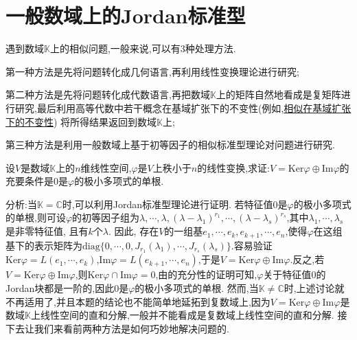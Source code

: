 \documentclass[../../main.tex]{subfiles}
\begin{document}
\section{一般数域上的Jordan标准型}

遇到数域$\mathbb{K}$上的相似问题,一般来说,可以有3种处理方法. 

第一种方法是先将问题转化成几何语言,再利用线性变换理论进行研究;

第二种方法是先将问题转化成代数语言,再把数域$\mathbb{K}$上的矩阵自然地看成是复矩阵进行研究,最后利用高等代数中若干概念在基域扩张下的不变性(例如,\hyperref[corollary:矩阵的相似关系在基域扩张下不变]{相似在基域扩张下的不变性}) 将所得结果返回到数域$\mathbb{K}$上;

第三种方法是利用一般数域上基于初等因子的相似标准型理论对问题进行研究. 

\begin{proposition}\label{proposition:数域K上关于核与值域的直和分解的充要条件}
设$V$是数域$\mathbb{K}$上的$n$维线性空间,$\varphi$是$V$上秩小于$n$的线性变换,求证:$V=\mathrm{Ker}\varphi\oplus\mathrm{Im}\varphi$的充要条件是$0$是$\varphi$的极小多项式的单根.
\end{proposition}
\begin{note}
分析:当$\mathbb{K}=\mathbb{C}$时,可以利用Jordan标准型理论进行证明. 若特征值$0$是$\varphi$的极小多项式的单根,则可设$\varphi$的初等因子组为$\lambda,\cdots,\lambda,(\lambda - \lambda_1)^{r_1},\cdots,(\lambda - \lambda_s)^{r_s}$,其中$\lambda_1,\cdots,\lambda_s$是非零特征值, 且有$k$个$\lambda$. 因此, 存在$V$的一组基$e_1,\cdots,e_k,e_{k + 1},\cdots,e_n$,使得$\varphi$在这组基下的表示矩阵为$\mathrm{diag}\{0,\cdots,0,J_{r_1}(\lambda_1),\cdots,J_{r_s}(\lambda_s)\}$.容易验证$\mathrm{Ker}\varphi = L(e_1,\cdots,e_k)$,$\mathrm{Im}\varphi = L(e_{k + 1},\cdots,e_n)$,于是$V=\mathrm{Ker}\varphi\oplus\mathrm{Im}\varphi$.反之,若$V=\mathrm{Ker}\varphi\oplus\mathrm{Im}\varphi$,则$\mathrm{Ker}\varphi\cap\mathrm{Im}\varphi = 0$,由的充分性的证明可知,$\varphi$关于特征值$0$的Jordan块都是一阶的,因此$0$是$\varphi$的极小多项式的单根. 然而,当$\mathbb{K}\neq\mathbb{C}$时,上述讨论就不再适用了,并且本题的结论也不能简单地延拓到复数域上,因为$V=\mathrm{Ker}\varphi\oplus\mathrm{Im}\varphi$是数域$\mathbb{K}$上线性空间的直和分解,一般并不能看成是复数域上线性空间的直和分解. 接下去让我们来看前两种方法是如何巧妙地解决问题的.
\end{note}
\end{document}
